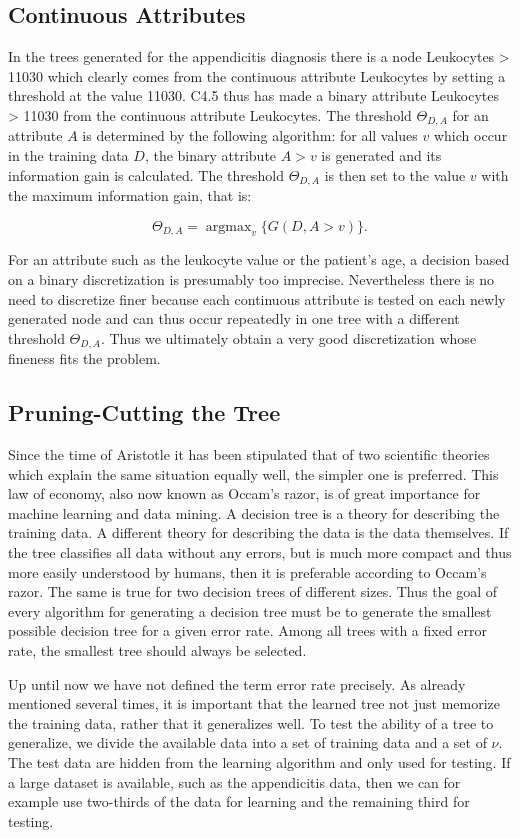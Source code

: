 \documentclass[10pt]{book}
\begin{document}
\subsection{Continuous Attributes}
In the trees generated for the appendicitis diagnosis there is a node Leukocytes > 11030 which clearly comes from the continuous attribute Leukocytes by setting a threshold at the value 11030. C4.5 thus has made a binary attribute Leukocytes > 11030 from the continuous attribute Leukocytes. The threshold $\Theta_{D, A}$ for an attribute $A$ is determined by the following algorithm: for all values $v$ which occur in the training data $D$, the binary attribute $A>v$ is generated and its information gain is calculated. The threshold $\Theta_{D, A}$ is then set to the value $v$ with the maximum information gain, that is:

$$
\Theta_{D, A}=\operatorname{argmax}_{v}\{G(D, A>v)\} .
$$

For an attribute such as the leukocyte value or the patient's age, a decision based on a binary discretization is presumably too imprecise. Nevertheless there is no need to discretize finer because each continuous attribute is tested on each newly generated node and can thus occur repeatedly in one tree with a different threshold $\Theta_{D, A}$. Thus we ultimately obtain a very good discretization whose fineness fits the problem.

\subsection{Pruning-Cutting the Tree}
Since the time of Aristotle it has been stipulated that of two scientific theories which explain the same situation equally well, the simpler one is preferred. This law of economy, also now known as Occam's razor, is of great importance for machine learning and data mining.
A decision tree is a theory for describing the training data. A different theory for describing the data is the data themselves. If the tree classifies all data without any errors, but is much more compact and thus more easily understood by humans, then it is preferable according to Occam's razor. The same is true for two decision trees of different sizes. Thus the goal of every algorithm for generating a decision tree must be to generate the smallest possible decision tree for a given error rate. Among all trees with a fixed error rate, the smallest tree should always be selected.

Up until now we have not defined the term error rate precisely. As already mentioned several times, it is important that the learned tree not just memorize the training data, rather that it generalizes well. To test the ability of a tree to generalize, we divide the available data into a set of training data and a set of $\nu$. The test data are hidden from the learning algorithm and only used for testing. If a large dataset is available, such as the appendicitis data, then we can for example use two-thirds of the data for learning and the remaining third for testing.
\end{document}
